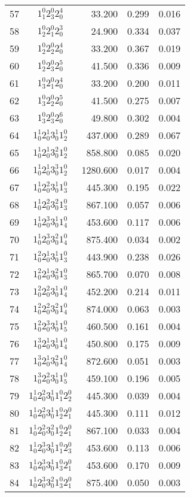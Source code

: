 \begin{table}
\begin{tabular}{rcrrr}
57&$1_1^0 2_3^0 2_0^4$& 33.200& 0.299& 0.016\\
58&$1_2^0 2_1^0 2_0^3$& 24.900& 0.334& 0.037\\
59&$1_2^0 2_2^0 2_0^4$& 33.200& 0.367& 0.019\\
60&$1_2^0 2_3^0 2_0^5$& 41.500& 0.336& 0.009\\
61&$1_3^0 2_1^0 2_0^4$& 33.200& 0.200& 0.011\\
62&$1_3^0 2_2^0 2_0^5$& 41.500& 0.275& 0.007\\
63&$1_3^0 2_3^0 2_0^6$& 49.800& 0.302& 0.004\\
64&$1_0^1 2_0^1 3_0^1 1_2^0$& 437.000& 0.289& 0.067\\
65&$1_0^1 2_0^1 3_0^2 1_2^0$& 858.800& 0.085& 0.020\\
66&$1_0^1 2_0^1 3_0^3 1_2^0$& 1280.600& 0.017& 0.004\\
67&$1_0^1 2_0^2 3_0^1 1_3^0$& 445.300& 0.195& 0.022\\
68&$1_0^1 2_0^2 3_0^2 1_3^0$& 867.100& 0.057& 0.006\\
69&$1_0^1 2_0^3 3_0^1 1_4^0$& 453.600& 0.117& 0.006\\
70&$1_0^1 2_0^3 3_0^2 1_4^0$& 875.400& 0.034& 0.002\\
71&$1_0^2 2_0^1 3_0^1 1_3^0$& 443.900& 0.238& 0.026\\
72&$1_0^2 2_0^1 3_0^2 1_3^0$& 865.700& 0.070& 0.008\\
73&$1_0^2 2_0^2 3_0^1 1_4^0$& 452.200& 0.214& 0.011\\
74&$1_0^2 2_0^2 3_0^2 1_4^0$& 874.000& 0.063& 0.003\\
75&$1_0^2 2_0^3 3_0^1 1_5^0$& 460.500& 0.161& 0.004\\
76&$1_0^3 2_0^1 3_0^1 1_4^0$& 450.800& 0.175& 0.009\\
77&$1_0^3 2_0^1 3_0^2 1_4^0$& 872.600& 0.051& 0.003\\
78&$1_0^3 2_0^2 3_0^1 1_5^0$& 459.100& 0.196& 0.005\\
79&$1_0^1 2_0^2 3_0^1 1_1^0 2_2^0$& 445.300& 0.039& 0.004\\
80&$1_0^1 2_0^2 3_0^1 1_2^0 2_1^0$& 445.300& 0.111& 0.012\\
81&$1_0^1 2_0^2 3_0^2 1_2^0 2_1^0$& 867.100& 0.033& 0.004\\
82&$1_0^1 2_0^3 3_0^1 1_1^0 2_3^0$& 453.600& 0.113& 0.006\\
83&$1_0^1 2_0^3 3_0^1 1_3^0 2_1^0$& 453.600& 0.170& 0.009\\
84&$1_0^1 2_0^3 3_0^2 1_3^0 2_1^0$& 875.400& 0.050& 0.003\\

\end{tabular}
\end{table}
